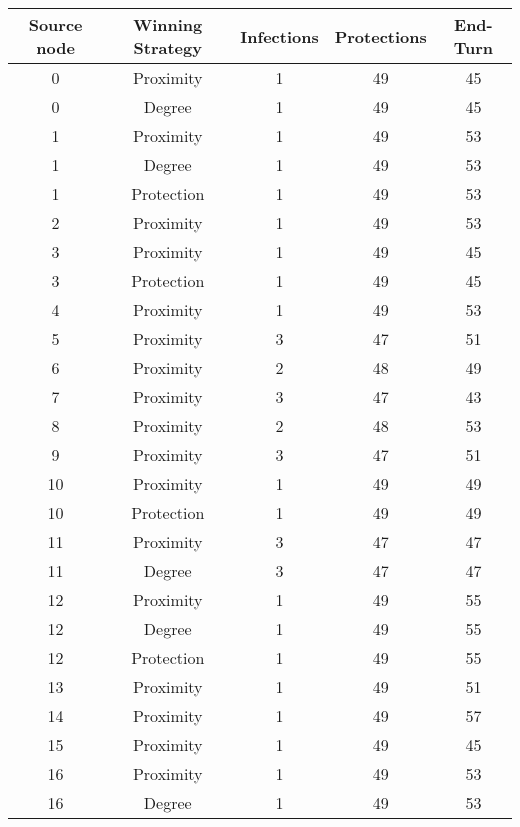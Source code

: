 \documentclass[results.tex]{subfiles}
\begin{document}
\begin{center}
  \begin{tabular}{| c || c | c | c | c |}
    \hline
    {\bfseries Source node} & {\bfseries Winning Strategy} & {\bfseries Infections} & {\bfseries Protections} & {\bfseries End-Turn} \\  %
    \hline\hline
    0 & Proximity & 1 & 49 & 45 \\ 
    \hline
    0 & Degree & 1 & 49 & 45 \\ 
    \hline
    1 & Proximity & 1 & 49 & 53 \\ 
    \hline
    1 & Degree & 1 & 49 & 53 \\ 
    \hline
    1 & Protection & 1 & 49 & 53 \\ 
    \hline
    2 & Proximity & 1 & 49 & 53 \\ 
    \hline
    3 & Proximity & 1 & 49 & 45 \\ 
    \hline
    3 & Protection & 1 & 49 & 45 \\ 
    \hline
    4 & Proximity & 1 & 49 & 53 \\ 
    \hline
    5 & Proximity & 3 & 47 & 51 \\ 
    \hline
    6 & Proximity & 2 & 48 & 49 \\ 
    \hline
    7 & Proximity & 3 & 47 & 43 \\ 
    \hline
    8 & Proximity & 2 & 48 & 53 \\ 
    \hline
    9 & Proximity & 3 & 47 & 51 \\ 
    \hline
    10 & Proximity & 1 & 49 & 49 \\ 
    \hline
    10 & Protection & 1 & 49 & 49 \\ 
    \hline
    11 & Proximity & 3 & 47 & 47 \\ 
    \hline
    11 & Degree & 3 & 47 & 47 \\ 
    \hline
    12 & Proximity & 1 & 49 & 55 \\ 
    \hline
    12 & Degree & 1 & 49 & 55 \\ 
    \hline
    12 & Protection & 1 & 49 & 55 \\ 
    \hline
    13 & Proximity & 1 & 49 & 51 \\ 
    \hline
    14 & Proximity & 1 & 49 & 57 \\ 
    \hline
    15 & Proximity & 1 & 49 & 45 \\ 
    \hline
    16 & Proximity & 1 & 49 & 53 \\ 
    \hline
    16 & Degree & 1 & 49 & 53 \\ 

\end{tabular}
\end{center}
\end{document}

